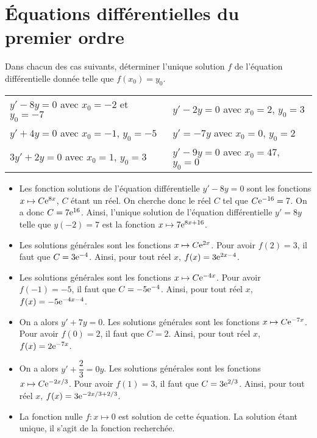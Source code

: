 \documentclass[11pt,fleqn, openany]{book} %
\begin{document}


\section*{Équations différentielles du premier ordre}


\begin{exercise}[topic=diff03]Dans chacun des cas suivants, déterminer l'unique solution $f$ de l'équation différentielle donnée telle que $f(x_0)=y_0$.

\renewcommand{\arraystretch}{1.2}
\begin{tabularx}{\linewidth}{XX}
$y'-8y=0$ avec $x_0=-2$ et $y_0=-7$
& $y'-2y=0$ avec $x_0=2$, $y_0=3$
\\ $y'+4y=0$ avec $x_0=-1$, $y_0=-5$
& $y'=-7y$ avec $x_0=0$, $y_0=2$
\\ $3y'+2y=0$ avec $x_0=1$, $y_0=3$
& $y'-9y=0$ avec $x_0=47$, $y_0=0$
\end{tabularx}\end{exercise}


\begin{solution} \hspace{0pt}

\begin{itemize}\item Les fonction solutions de l'équation différentielle \(y'-8y=0\) sont les fonctions \(x\mapsto C\mathrm{e}^{8x}\), \(C\) étant un réel. 
On cherche donc le réel \(C\) tel que \(C\mathrm{e}^{-16}=7\). On a donc \(C=7\mathrm{e}^{16}\). Ainsi, l'unique solution de l'équation différentielle \(y'=8y\) telle que \(y(-2)=7\) est la fonction \(x\mapsto 7\mathrm{e}^{8x+16}\).
\vskip5pt
\item Les solutions générales sont les fonctions \(x\mapsto C\mathrm{e}^{2x}\). Pour avoir \(f(2)=3\), il faut que \(C=3\mathrm{e}^{-4}\). Ainsi, pour tout réel \(x\), \(f(x)=3\mathrm{e}^{2x-4}\).
\vskip5pt
\item Les solutions générales sont les fonctions \(x\mapsto C\mathrm{e}^{-4x}\). Pour avoir \(f(-1)=-5\), il faut que \(C=-5\mathrm{e}^{-4}\). Ainsi, pour tout réel \(x\), \(f(x)=-5\mathrm{e}^{-4x-4}\).
\vskip5pt
\item  On a alors \(y'+7y=0\). Les solutions générales sont les fonctions \(x\mapsto C\mathrm{e}^{-7x}\). Pour avoir \(f(0)=2\), il faut que \(C=2\). Ainsi, pour tout réel \(x\), \(f(x)=2\mathrm{e}^{-7x}\).
\vskip5pt
\item On a alors \(y'+\dfrac{2}{3}=0y\). Les solutions générales sont les fonctions \(x\mapsto C\mathrm{e}^{-2x/3}\). Pour avoir \(f(1)=3\), il faut que \(C=3\mathrm{e}^{2/3}\). Ainsi, pour tout réel \(x\), \(f(x)=3\mathrm{e}^{-2x/3+2/3}\).
\vskip5pt
\item La fonction nulle \(f:x\mapsto 0\) est solution de cette équation. La solution étant unique, il s'agit de la fonction recherchée.

\end{itemize} \end{solution}
\end{document}
